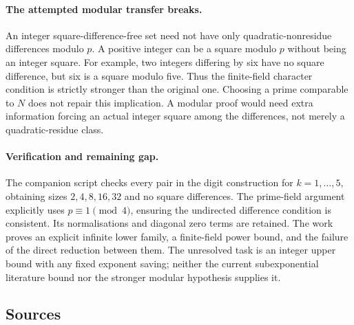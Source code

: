 \documentclass[11pt,a4paper]{article}
\begin{document}
\paragraph{The attempted modular transfer breaks.}
An integer square-difference-free set need not have only quadratic-nonresidue differences modulo $p$. A positive integer can be a square modulo $p$ without being an integer square. For example, two integers differing by six have no square difference, but six is a square modulo five. Thus the finite-field character condition is strictly stronger than the original one. Choosing a prime comparable to $N$ does not repair this implication. A modular proof would need extra information forcing an actual integer square among the differences, not merely a quadratic-residue class.

\paragraph{Verification and remaining gap.}
The companion script checks every pair in the digit construction for $k=1,\ldots,5$, obtaining sizes $2,4,8,16,32$ and no square differences. The prime-field argument explicitly uses $p\equiv1\pmod4$, ensuring the undirected difference condition is consistent. Its normalisations and diagonal zero terms are retained. The work proves an explicit infinite lower family, a finite-field power bound, and the failure of the direct reduction between them. The unresolved task is an integer upper bound with any fixed exponent saving; neither the current subexponential literature bound nor the stronger modular hypothesis supplies it.

\subsection{Sources}
\end{document}

